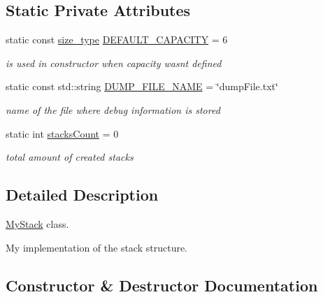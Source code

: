\subsection*{Static Private Attributes}
\begin{DoxyCompactItemize}
\item 
\mbox{\label{class_my_stack_a196ecbddd3e12d87fd29c8d61d04ba5b}} 
static const \hyperlink{class_my_stack_a6e8ab1801eb1cf3b66928e0c0f2fe0fe}{size\+\_\+type} \hyperlink{class_my_stack_a196ecbddd3e12d87fd29c8d61d04ba5b}{D\+E\+F\+A\+U\+L\+T\+\_\+\+C\+A\+P\+A\+C\+I\+TY} = 6
\begin{DoxyCompactList}\small\item\em is used in constructor when capacity wasn\textquotesingle{}t defined \end{DoxyCompactList}\item 
\mbox{\label{class_my_stack_ab3912249fbbd11acf6f4016d3aba1b89}} 
static const std\+::string \hyperlink{class_my_stack_ab3912249fbbd11acf6f4016d3aba1b89}{D\+U\+M\+P\+\_\+\+F\+I\+L\+E\+\_\+\+N\+A\+ME} = \char`\"{}dump\+File.\+txt\char`\"{}
\begin{DoxyCompactList}\small\item\em name of the file where debug information is stored \end{DoxyCompactList}\item 
\mbox{\label{class_my_stack_ada55cd79cd79a6476efbf867ac1ffba1}} 
static int \hyperlink{class_my_stack_ada55cd79cd79a6476efbf867ac1ffba1}{stacks\+Count} = 0
\begin{DoxyCompactList}\small\item\em total amount of created stacks \end{DoxyCompactList}\end{DoxyCompactItemize}


\subsection{Detailed Description}
\hyperlink{class_my_stack}{My\+Stack} class. 

My implementation of the stack structure. 

\subsection{Constructor \& Destructor Documentation}
\mbox{\label{class_my_stack_aacc8c6eb2c3ae83c01f14a5f58477254}} 

